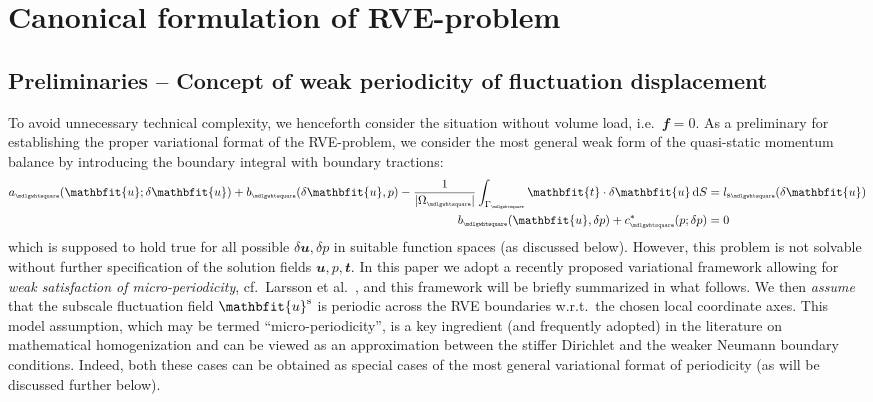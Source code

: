 \documentclass[12pt,a4paper]{article}
\renewcommand{\ta}[1]{\mathbfit{#1}}
\renewcommand{\Box}{\mdlgwhtsquare}
\newcommand{\volume}{|\Omega_\rve|}
\newcommand{\rve}{
  {\mathchoice
   {\mbox{\scalebox{0.67}{$\Box$}}}
   {\mbox{\scalebox{0.67}{$\Box$}}}
   {\mbox{\scalebox{0.5}{$\Box$}}}
   {\mbox{\scalebox{0.375}{$\Box$}}}
  }
}
\begin{document}
\section{Canonical formulation of RVE-problem}

\subsection{Preliminaries -- Concept of weak periodicity of fluctuation displacement}

To avoid unnecessary technical complexity, we henceforth consider the situation without volume load, i.e.\ $\ta{f}=\ta{0}$.
As a preliminary for establishing the proper variational format of the RVE-problem, we consider the most general weak form of the quasi-static momentum balance by introducing the boundary integral with boundary tractions:
\begin{subequations}
\begin{align}
    a_\rve(\ta{u};\delta\ta{u}) + b_\rve(\delta\ta{u},p) - \frac{1}{\volume}\int_{\Gamma_\rve} \ta{t}\cdot\delta\ta{u} \dif S &= l_{\fluct\rve}(\delta\ta{u})
\label{eq19a} \\
    b_\rve(\ta{u},\delta p) + c^*_\rve(p;\delta p) &= 0
\label{eq19b}
\end{align}
\end{subequations}
which is supposed to hold true for all possible $\delta\ta{u}, \delta p$ in suitable function spaces (as discussed below).
However, this problem is not solvable without further specification of the solution fields $\ta{u}, p, \ta{t}$.
In this paper we adopt a recently proposed variational framework allowing for \emph{weak satisfaction of micro-periodicity}, cf.\  Larsson et al.\ \cite{larsson_computational_2011}, and this framework will be briefly summarized in what follows.
We then \emph{assume} that the subscale fluctuation field $\ta{u}^\fluct$ is periodic across the RVE boundaries w.r.t.\ the chosen local coordinate axes.
This model assumption, which may be termed ``micro-periodicity'', is a key ingredient (and frequently adopted) in the literature on mathematical homogenization and can be viewed as an approximation between the stiffer Dirichlet and the weaker Neumann boundary conditions.
Indeed, both these cases can be obtained as special cases of the most general variational format of periodicity (as will be discussed further below).
\end{document}
